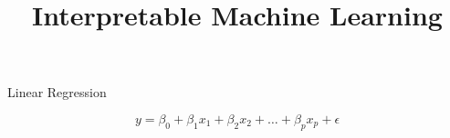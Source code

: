 \documentclass[11pt,compress,t,notes=noshow, aspectratio=169, xcolor=table]{beamer}
\title{Interpretable Machine Learning}
\date{}
\begin{document}
\newcommand{\titlefigure}{figure/whitebox}
\newcommand{\learninggoals}{
\item Examples of popular interpretable models
\item Properties of some interpretable models
\item How can we interpret them?}





\begin{frame}[c]{Linear Regression}

$$y = \beta_0 + \beta_1 x_1 + \beta_2 x_2 + \dots + \beta_p x_p + \epsilon$$


\end{frame}
\end{document}
